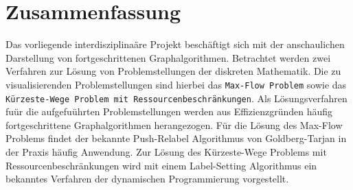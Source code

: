 %
%
%
%

\section*{Zusammenfassung}
Das vorliegende interdisziplina\"are Projekt besch\"aftigt sich mit der anschaulichen Darstellung von fortgeschrittenen Graphalgorithmen. Betrachtet werden zwei Verfahren zur L\"osung von Problemstellungen der diskreten Mathematik. Die zu visualisierenden Problemstellungen sind hierbei das \texttt{Max-Flow Problem} sowie das \texttt{K\"urzeste-Wege Problem mit Ressourcenbeschr\"ankungen}. Als L\"osungsverfahren fu\"ur die aufgefu\"uhrten Problemstellungen werden aus Effizienzgr\"unden h\"aufig fortgeschrittene Graphalgorithmen herangezogen. F\"ur die L\"osung des Max-Flow Problems findet der bekannte Push-Relabel Algorithmus von Goldberg-Tarjan in der Praxis h\"aufig Anwendung. Zur L\"osung des K\"urzeste-Wege Problems mit Ressourcenbeschr\"ankungen wird mit einem Label-Setting Algorithmus ein bekanntes Verfahren der dynamischen Programmierung vorgestellt.


